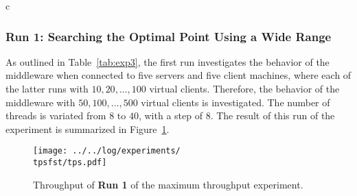 \documentclass[11pt]{article}
\theoremstyle{definition}
\newcommand\re[1]{{\color[HTML]{ee1111}#1}}
\newcommand\plotscale{1.2}
\newcommand\tpsfst{03_maximum_throughput_16-11-10_21:14:41}
\begin{document}
\begin{comment}
In the first run, a wide range of virtual clients has been selected, namely from $50$ to $450$, with a relatively large step of $100$, and for the threads a range from $8$ to $40$ with step $8$ has been selected.
Noting that the system becomes more instable as the number of virtual clients increases, and also that having more than $32$ threads %
does not increase the performance significantly, for the second run the range of virtual clients has been slightly shrinked to $50,350$ with a more granular step of $50$, and the number of threads to $16,32$, still with a step of $8$.
Finally, in the third run of the experiment, an even more granular investigation has been performed around what resulted to be the optimal point, that is, from $200$ to $300$ virtual clients, just for $16$ and $24$ threads.
In rest of this section, a detailed analysis of each of the three runs is presented.
\end{comment}c

\subsubsection{\re{Run 1}: Searching the Optimal Point Using a Wide Range}

As outlined in Table~\ref{tab:exp3}, the first run investigates the behavior of the middleware when connected to five servers and five client machines, where each of the latter runs with $10,20,\ldots,100$ virtual clients.
Therefore, the behavior of the middleware with $50,100,\ldots,500$ virtual clients is investigated.
The number of threads is variated from $8$ to $40$, with a step of $8$.
The result of this run of the experiment is summarized in Figure~\ref{fig:tps1}.

\begin{figure}[!h]
    \centering
    \texttt{[image: ../../log/experiments/\\tpsfst/tps.pdf]}
    \caption{Throughput of \re{\bf Run 1} of the maximum throughput experiment.}
    \label{fig:tps1}
\end{figure}
\end{document}
